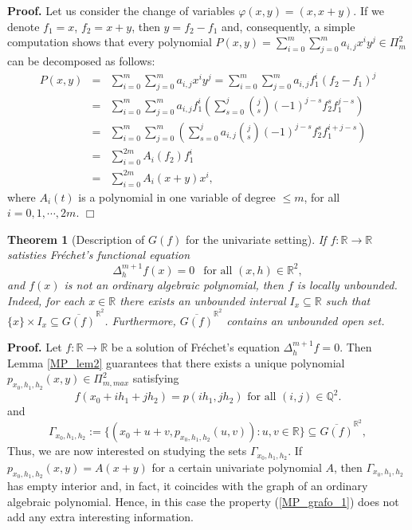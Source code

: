 \documentclass[10pt,a4paper]{amsart}
\newtheorem{theorem}{Theorem}[section]
\theoremstyle{definition}
\begin{document}
\noindent \textbf{Proof. } Let us consider the change of variables $\varphi(x,y)=(x,x+y)$. If we denote $f_1=x$, $f_2=x+y$, then $y=f_2-f_1$ and, consequently, a simple computation shows that every polynomial 
$P(x,y)=\sum_{i=0}^m\sum_{j=0}^ma_{i,j}x^iy^j\in \Pi_m^2$ can be decomposed as follows:
\begin{eqnarray*}
P(x,y) &= & \sum_{i=0}^m\sum_{j=0}^ma_{i,j}x^iy^j = \sum_{i=0}^m\sum_{j=0}^ma_{i,j}f_1^i(f_2-f_1)^j \\
&=& \sum_{i=0}^m\sum_{j=0}^ma_{i,j}f_1^i (\sum_{s=0}^j\binom{j}{s}(-1)^{j-s}f_2^sf_1^{j-s}) \\
&=& \sum_{i=0}^m\sum_{j=0}^m(\sum_{s=0}^ja_{i,j}\binom{j}{s}(-1)^{j-s}f_2^sf_1^{i+j-s}) \\
&=& \sum_{i=0}^{2m}A_i(f_2)f_1^i \\
&=& \sum_{i=0}^{2m}A_i(x+y)x^i,
\end{eqnarray*}
where $A_i(t)$ is a  polynomial in one variable of degree $\leq m$, for all $i=0,1,\cdots, 2m$.  {\hfill $\Box$}

\begin{theorem}[Description of $G(f)$ for the univariate setting]  \label{MP_grafo_1v} If $f:\mathbb{R}\to\mathbb{R}$ satisties Fr\'{e}chet's functional equation
\[
\Delta_h^{m+1}f(x)=0 \ \ \text{ for all  }(x,h) \in\mathbb{R}^2,
\]
and $f(x)$ is not an ordinary algebraic polynomial, then $f$ is locally unbounded. Indeed, for each  
 $x\in\mathbb{R}$ there exists an unbounded interval  $I_x\subseteq \mathbb{R}$ such that  $\{x\}\times I_x\subseteq  \overline{G(f)}^{\mathbb{R}^2}$. Furthermore, $ \overline{G(f)}^{\mathbb{R}^2}$ contains an unbounded open set. 
\end{theorem}

\noindent \textbf{Proof. }  Let $f:\mathbb{R}\to\mathbb{R}$ be a solution of Fr\'{e}chet's equation  $\Delta_h^{m+1}f=0$. Then Lemma \ref{MP_lem2} guarantees that there exists a unique polynomial  $p_{x_0,h_1,h_2}(x,y)\in  \Pi_{m,max}^2 $ satisfying  
\begin{equation}\label{Q2}
f(x_0+ih_1+jh_2)=p(ih_1,jh_2) \text{ for all }(i,j)\in\mathbb{Q}^2.
\end{equation}
and
 \begin{equation}\label{MP_grafo_1}
 \Gamma_{x_0,h_1,h_2}:=\{(x_0+u+v,p_{x_0,h_1,h_2}(u,v)):u,v\in\mathbb{R}\}\subseteq \overline{G(f)}^{\mathbb{R}^2}, 
 \end{equation}
Thus, we are now interested on studying the sets  $\Gamma_{x_0,h_1,h_2}$. 
If $p_{x_0,h_1,h_2}(x,y)=A(x+y)$ for a certain univariate polynomial $A$, then $\Gamma_{x_0,h_1,h_2}$ has empty interior and, in fact, it coincides with the graph of an ordinary algebraic polynomial. Hence, in this case  the property (\ref{MP_grafo_1}) does not add any extra interesting information. 
\end{document}
